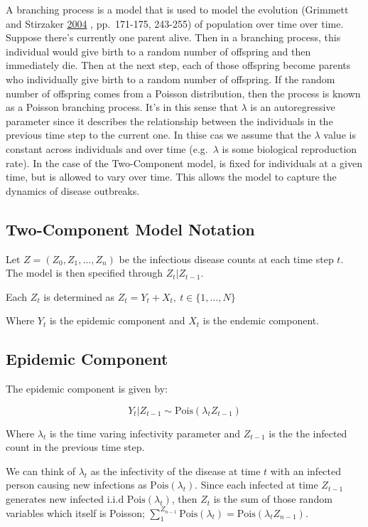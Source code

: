 \documentclass[11pt,a4paper]{article}
\numberwithin{equation}{section}
\begin{document}
A branching process is a model that is used to model the evolution
(Grimmett and Stirzaker
\protect\hyperlink{ref-grimmett_probability_2004}{2004} , pp.~171-175,
243-255) of population over time over time. Suppose there's currently
one parent alive. Then in a branching process, this individual would
give birth to a random number of offspring and then immediately die.
Then at the next step, each of those offspring become parents who
individually give birth to a random number of offspring. If the random
number of offspring comes from a Poisson distribution, then the process
is known as a Poisson branching process. It's in this sense that
\(\lambda\) is an autoregressive parameter since it describes the
relationship between the individuals in the previous time step to the
current one. In thise cas we assume that the \(\lambda\) value is
constant across individuals and over time (e.g.~\(\lambda\) is some
biological reproduction rate). In the case of the Two-Component model,
is fixed for individuals at a given time, but is allowed to vary over
time. This allows the model to capture the dynamics of disease
outbreaks.

\hypertarget{two-component-model-notation}{%
\subsection{Two-Component Model
Notation}\label{two-component-model-notation}}

Let \(Z = (Z_0, Z_1, ..., Z_n)\) be the infectious disease counts at
each time step \(t\). The model is then specified through
\(Z_t | Z_{t-1}\).

Each \(Z_t\) is determined as \(Z_t = Y_t + X_t,\ t \in \{1,\dots, N\}\)

Where \(Y_t\) is the epidemic component and \(X_t\) is the endemic
component.

\hypertarget{epidemic-component}{%
\subsection{Epidemic Component}\label{epidemic-component}}

The epidemic component is given by:

\[Y_t|Z_{t-1} \sim\text{Pois}(\lambda_tZ_{t-1})\]

Where \(\lambda_t\) is the time varing infectivity parameter and
\(Z_{t-1}\) is the the infected count in the previous time step.

We can think of \(\lambda_t\) as the infectivity of the disease at time
\(t\) with an infected person causing new infections as
\(\text{Pois}(\lambda_t)\). Since each infected at time \(Z_{t-1}\)
generates new infected i.i.d \(\text{Pois}(\lambda_t)\), then \(Z_t\) is
the sum of those random variables which itself is Poisson;
\(\sum_1^{Z_{n-1}}\text{Pois}(\lambda_t) =\text{Pois}(\lambda_tZ_{n-1})\).
\end{document}
